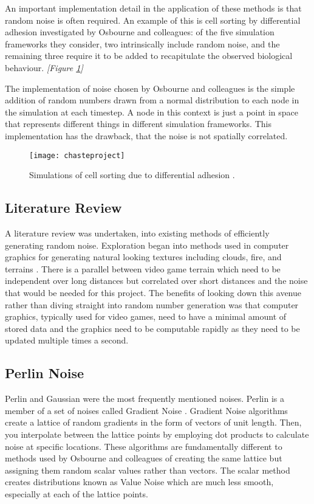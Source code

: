 \documentclass[11pt,a4paper]{article}
\begin{document}
An important implementation detail in the application of these methods is that random noise is often required. An example of this is cell sorting by differential adhesion investigated by Osbourne and colleagues: of the five simulation frameworks they consider, two intrinsically include random noise, and the remaining three require it to be added to recapitulate the observed biological behaviour. \emph{[Figure \ref{fig:chaseproject}]}

The implementation of noise chosen by Osbourne and colleagues is the simple addition of random numbers drawn from a normal distribution to each node in the simulation at each timestep. A node in this context is just a point in space that represents different things in different simulation frameworks. This implementation has the drawback, that the noise is not spatially correlated.

\begin{figure}[h]
	\centering
	\texttt{[image: chasteproject]}
	\caption{Simulations of cell sorting due to differential adhesion \cite{chaste}.}
	\label{fig:chaseproject} 
\end{figure}

\subsection{Literature Review}

A literature review was undertaken, into existing methods of efficiently generating random noise. Exploration began into methods used in computer graphics \cite{modpart} for generating natural looking textures including clouds, fire, and terrains \cite{terrain}. There is a parallel between video game terrain \cite{vidgames} which need to be independent over long distances but correlated over short distances and the noise that would be needed for this project. The benefits of looking down this avenue rather than diving straight into random number generation was that computer graphics, typically used for video games, need to have a minimal amount of stored data and the graphics need to be computable rapidly as they need to be updated multiple times a second.

\subsection{Perlin Noise}

Perlin and Gaussian were the most frequently mentioned noises. Perlin \cite{perlin} is a member of a set of noises called Gradient Noise \cite{infterrain}. Gradient Noise algorithms create a lattice of random gradients in the form of vectors of unit length. Then, you interpolate between the lattice points by employing dot products to calculate noise at specific locations. These algorithms are fundamentally different to methods used by Osbourne and colleagues of creating the same lattice but assigning them random scalar values rather than vectors. The scalar method creates distributions known as Value Noise which are much less smooth, especially at each of the lattice points. 
\end{document}
